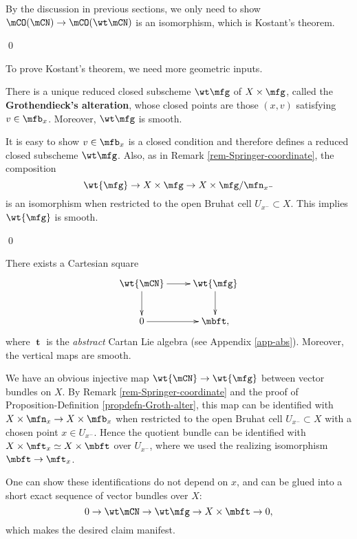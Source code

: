 	\proof
		By the discussion in previous sections, we only need to show $\mCO(\mCN) \to \mCO(\wt\mCN)$ is an isomorphism, which is Kostant's theorem.

	\qed

	To prove Kostant's theorem, we need more geometric inputs.

	\begin{propdefn}
		\label{propdefn-Groth-alter}
		There is a unique reduced closed subscheme $\wt\mfg$ of $X\mt \mfg$, called the \textbf{Grothendieck's alteration}, whose closed points are those $(x,v)$ satisfying $v\in \mfb_x$. Moreover, $\wt\mfg$ is smooth.
	\end{propdefn}

	\proof[Sketch]
		It is easy to show $v\in \mfb_x$ is a closed condition and therefore defines a reduced closed subscheme $\wt\mfg$. Also, as in Remark \ref{rem-Springer-coordinate}, the composition 
		\[
			\wt{\mfg} \to X\mt \mfg \to X \mt \mfg/\mfn_{x^-}
		\] 
		is an isomorphism when restricted to the open Bruhat cell $U_{x^-}\subset X$. This implies $\wt{\mfg}$ is smooth.

	\qed



	\begin{lem}
		\label{lem-Groth-alter-Cartan}
		There exists a Cartesian square
		\[
			\xymatrix{
				\wt{\mCN} \ar[r] \ar[d] & \wt{\mfg} \ar[d] \\
				0 \ar[r] & \mbft,
			}
		\]
		where $\mbft$ is the \emph{abstract} Cartan Lie algebra (see Appendix \ref{app-abs}). Moreover, the vertical maps are smooth.

	\end{lem}

	\proof[Sketch]
		We have an obvious injective map $\wt{\mCN} \to \wt{\mfg}$ between vector bundles on $X$. By Remark \ref{rem-Springer-coordinate} and the proof of Proposition-Definition \ref{propdefn-Groth-alter}, this map can be identified with $X\mt \mfn_x \to X\mt \mfb_x $ when restricted to the open Bruhat cell $U_{x^-} \subset X$ with a chosen point $x\in U_{x^-}$. Hence the quotient bundle can be identified with $X \mt \mft_x \simeq X\mt \mbft$ over $U_{x^{-}}$, where we used the realizing isomorphism $\mbft \to \mft_x$.

		One can show these identifications do not depend on $x$, and can be glued into a short exact sequence of vector bundles over $X$:
		\[
			0 \to \wt\mCN \to \wt\mfg \to X \mt \mbft \to 0,
		\]
		which makes the desired claim manifest.

